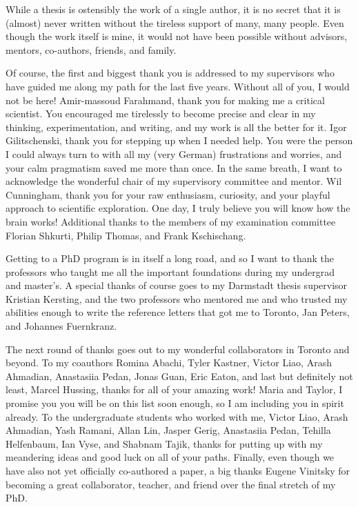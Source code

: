 While a thesis is ostensibly the work of a single author, it is no secret that it is (almost) never written without the tireless support of many, many people.
Even though the work itself is mine, it would not have been possible without advisors, mentors, co-authors, friends, and family.

Of course, the first and biggest thank you is addressed to my supervisors who have guided me along my path for the last five years.
Without all of you, I would not be here!
Amir-massoud Farahmand, thank you for making me a critical scientist. 
You encouraged me tirelessly to become precise and clear in my thinking, experimentation, and writing, and my work is all the better for it.
Igor Gilitschenski, thank you for stepping up when I needed help.
You were the person I could always turn to with all my (very German) frustrations and worries, and your calm pragmatism saved me more than once.
In the same breath, I want to acknowledge the wonderful chair of my supervisory committee and mentor.
Wil Cunningham, thank you for your raw enthusiasm, curiosity, and your playful approach to scientific exploration.
One day, I truly believe you will know how the brain works!
Additional thanks to the members of my examination committee Florian Shkurti, Philip Thomas, and Frank Kschischang.

Getting to a PhD program is in itself a long road, and so I want to thank the professors who taught me all the important foundations during my undergrad and master's.
A special thanks of course goes to my Darmstadt thesis supervisor Kristian Kersting, and the two professors who mentored me and who trusted my abilities enough to write the reference letters that got me to Toronto, Jan Peters, and Johannes Fuernkranz.

The next round of thanks goes out to my wonderful collaborators in Toronto and beyond.
To my coauthors Romina Abachi, Tyler Kastner, Victor Liao, Arash Ahmadian, Anastasiia Pedan, Jonas Guan, Eric Eaton, and last but definitely not least, Marcel Hussing, thanks for all of your amazing work!
Maria and Taylor, I promise you you will be on this list soon enough, so I am including you in spirit already.
To the undergraduate students who worked with me, Victor Liao, Arash Ahmadian, Yash Ramani, Allan Lin, Jasper Gerig, Anastasiia Pedan, Tehilla Helfenbaum, Ian Vyse, and Shabnam Tajik, thanks for putting up with my meandering ideas and good luck on all of your paths.
Finally, even though we have also not yet officially co-authored a paper, a big thanks Eugene Vinitsky for becoming a great collaborator, teacher, and friend over the final stretch of my PhD.

